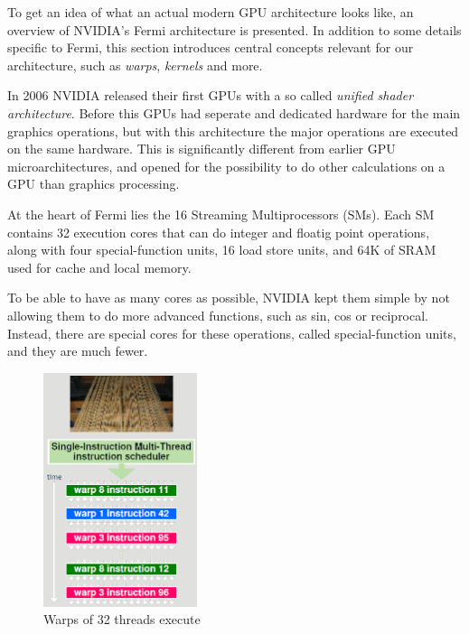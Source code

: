 \documentclass[../main/report.tex]{subfiles}
\begin{document}
To get an idea of what an actual modern GPU architecture looks like, an overview of NVIDIA's Fermi architecture is presented.
In addition to some details specific to Fermi, this section introduces central concepts relevant for our architecture, such as \emph{warps}, \emph{kernels} and more.




In 2006 NVIDIA released their first GPUs with a so called \emph{unified shader architecture}.
Before this GPUs had seperate and dedicated hardware for the main graphics operations, 
but with this architecture the major operations are executed on the same hardware.
This is significantly different from earlier GPU microarchitectures, and opened
for the possibility to do other calculations on a GPU than graphics processing.

At the heart of Fermi lies the 16 Streaming Multiprocessors (SMs). 
Each SM contains 32 execution cores that can do integer and floatig point operations, 
along with four special-function units, 16 load store units, 
and 64K of SRAM used for cache and local memory.

To be able to have as many cores as possible, NVIDIA kept them simple by not allowing them to do more advanced functions, such as sin, cos or reciprocal.
Instead, there are special cores for these operations, called special-function units, and they are much fewer.

\begin{figure}[H]
\centering
\includegraphics[width=0.4\textwidth]{../introduction/assets/warp.png}
\caption{Warps of 32 threads execute }
\label{fig:simple-nvidia-warps}
\end{figure}
\end{document}
